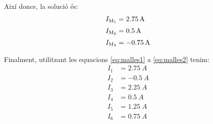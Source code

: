 \begin{exemple}
    Així doncs, la solució és:
    \begin{align*}
        I_\mathrm{M_1} &= \qty{2,75}{A} \\[0.5ex]
        I_\mathrm{M_2} &= \qty{0,5}{A} \\[0.5ex]
        I_\mathrm{M_3} &= \qty{-0,75}{A}
    \end{align*}

    Finalment, utilitzant les equacions \eqref{eq:malles1} a \eqref{eq:malles2} tenim:
    \begin{align*}
        I_1 &= \qty{2,75}{A} \\[0.5ex]
        I_2 &= \qty{-0,5}{A} \\[0.5ex]
        I_3 &= \qty{2,25}{A} \\[0.5ex]
        I_4 &= \qty{0,5}{A} \\[0.5ex]
        I_5 &=  \qty{1,25}{A} \\[0.5ex]
        I_6 &= \qty{0,75}{A}
    \end{align*}

\end{exemple}

